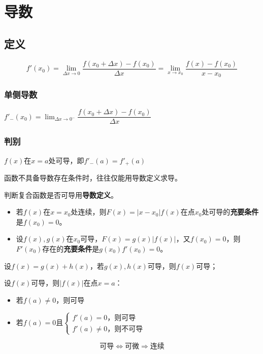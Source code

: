 
\chapter{导数}

\section{定义}
\[f'(x_0) = \lim_{\Delta x \to 0}\dfrac{f(x_0 + \Delta x) - f(x_0)}{\Delta x} = 
\lim_{x \to x_0}\dfrac{f(x) - f(x_0)}{x - x_0}\]

\subsection{单侧导数}
\(f'_-(x_0) = \displaystyle \lim_{\Delta x \to 0^-}\dfrac{f(x_0 + \Delta x) - f(x_0)}{\Delta x}\)

\subsection{判别}

\(f(x)\)在\(x = a\)处可导，即\(f'_-(a) = f'_+(a)\)

函数不具备导数存在条件时，往往仅能用导数定义求导。

判断复合函数是否可导用\textbf{导数定义}。
\begin{itemize}
    \item 若\(f(x)\)在\(x = x_0\)处连续，则\(F(x) = |x - x_0|f(x)\)在点\(x_0\)处可导的\textbf{充要条件}是\(f(x_0) = 0\)。
    \item 设\(f(x), g(x)\)在\(x_0\)可导，\(F(x) = g(x)|f(x)|\)，又\(f(x_0) = 0\)，则\(F'(x_0)\)存在的\textbf{充要条件}是\(g(x_0)f'(x_0) = 0\)。
\end{itemize}

设\(f(x) = g(x) + h(x)\)，若\(g(x), h(x)\)可导，则\(f(x)\)可导；

设\(f(x)\)可导，则\(|f(x)|\)在点\(x = a\)：\begin{itemize}
    \item 若\(f(a) \neq 0\)，则可导
    \item 若\(f(a) = 0\)且\(\begin{cases}
        f'(a) = 0\text{，则可导} \\ 
        f'(a) \neq 0\text{，则不可导}
    \end{cases}\)
\end{itemize}

\[\text{可导} \Leftrightarrow \text{可微} \Rightarrow \text{连续}\]



